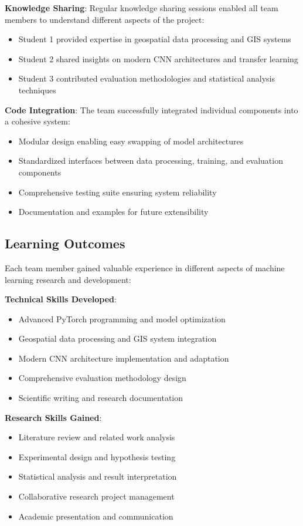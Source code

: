 \textbf{Knowledge Sharing}:
Regular knowledge sharing sessions enabled all team members to understand different aspects of the project:
\begin{itemize}
    \item Student 1 provided expertise in geospatial data processing and GIS systems
    \item Student 2 shared insights on modern CNN architectures and transfer learning
    \item Student 3 contributed evaluation methodologies and statistical analysis techniques
\end{itemize}

\textbf{Code Integration}:
The team successfully integrated individual components into a cohesive system:
\begin{itemize}
    \item Modular design enabling easy swapping of model architectures
    \item Standardized interfaces between data processing, training, and evaluation components
    \item Comprehensive testing suite ensuring system reliability
    \item Documentation and examples for future extensibility
\end{itemize}

\subsection{Learning Outcomes}

Each team member gained valuable experience in different aspects of machine learning research and development:

\textbf{Technical Skills Developed}:
\begin{itemize}
    \item Advanced PyTorch programming and model optimization
    \item Geospatial data processing and GIS system integration
    \item Modern CNN architecture implementation and adaptation
    \item Comprehensive evaluation methodology design
    \item Scientific writing and research documentation
\end{itemize}

\textbf{Research Skills Gained}:
\begin{itemize}
    \item Literature review and related work analysis
    \item Experimental design and hypothesis testing
    \item Statistical analysis and result interpretation
    \item Collaborative research project management
    \item Academic presentation and communication
\end{itemize}

